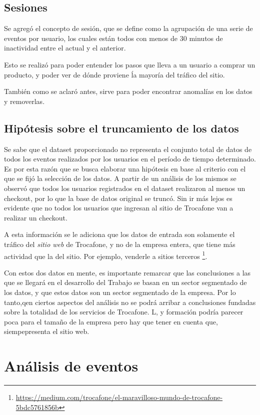 \documentclass[a4paper]{article}
\begin{document}
\subsection{Sesiones}

Se agregó el concepto de sesión, que se define como la agrupación de una serie de eventos por usuario, los cuales están todos con menos de 30 minutos de inactividad entre el actual y el anterior.

Esto se realizó para poder entender los pasos que lleva a un usuario a comprar un producto, y poder ver de dónde proviene ĺa mayoría del tráfico del sitio.

También como se aclaró antes, sirve para poder encontrar anomalías en los datos y removerlas.

\subsection{Hipótesis sobre el truncamiento de los datos}

Se sabe que el dataset proporcionado no representa el conjunto total de datos de todos los eventos realizados por los usuarios en el período de tiempo determinado. Es por esta razón que se busca elaborar una hipótesis en base al criterio con el que se fijó la selección de los datos. A partir de un análisis de los mismos se observó que todos los usuarios registrados en el dataset realizaron al menos un checkout, por lo que la base de datos original se truncó. Sin ir más lejos es evidente que no todos los usuarios que ingresan al sitio de Trocafone van a realizar un checkout.

A esta información se le adiciona que los datos de entrada son solamente el tráfico del \textit{sitio web} de Trocafone, y no de la empresa entera, que tiene más actividad que la del sitio. Por ejemplo, venderle a sitios terceros \footnote{\url{https://medium.com/trocafone/el-maravilloso-mundo-de-trocafone-5bdc5761856b}}.

Con estos dos datos en mente, es importante remarcar que las conclusiones a las que se llegará en el desarrollo del Trabajo se basan en un sector segmentado de los datos, y que estos datos son un sector segmentado de la empresa. Por lo tanto,qen ciertos aspectos del análisis no se podrá arribar a conclusiones fundadas sobre la totalidad de los servicios de Trocafone. L, y formación podría parecer poca para el tamaño de la empresa pero hay que tener en cuenta que, siempepresenta el sitio web.

\section{Análisis de eventos}
\end{document}
